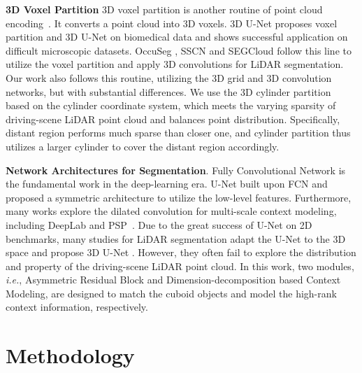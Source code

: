 \documentclass{article}
\def\ie{\emph{i.e.}}
\begin{document}
  \textbf{3D Voxel Partition}
  3D voxel partition is another routine of point cloud encoding~\cite{wang2020reconfigurable,han2020occuseg,zhu2020ssn,tchapmi2017segcloud,graham20183d}. It converts a point cloud into 3D voxels. 3D U-Net \citep{cciccek20163d} proposes voxel partition and 3D U-Net on biomedical data and shows successful application on difficult microscopic datasets. OccuSeg \citep{han2020occuseg}, SSCN \citep{graham20183d} and SEGCloud \citep{tchapmi2017segcloud} follow this line to utilize the voxel partition and apply 3D convolutions for LiDAR segmentation. Our work also follows this routine, utilizing the 3D grid and 3D convolution networks, but with substantial differences. We use the 3D cylinder partition based on the cylinder coordinate system, which meets the varying sparsity of driving-scene LiDAR point cloud and balances point distribution. Specifically, distant region performs much sparse than closer one, and cylinder partition thus utilizes a larger cylinder to cover the distant region accordingly. 
   




\textbf{Network Architectures for Segmentation}. Fully Convolutional Network \citep{long2015fully} is the fundamental work in the deep-learning era. U-Net \citep{ronneberger2015u} built upon FCN and proposed a symmetric architecture to utilize the low-level features. Furthermore, many works explore the dilated convolution for multi-scale context modeling, including DeepLab\citep{chen2017deeplab, chen2018encoder} and PSP~\cite{zhao2017pyramid}.
Due to the great success of U-Net on 2D benchmarks, many studies for LiDAR segmentation adapt the U-Net to the 3D space and propose 3D U-Net \citep{cciccek20163d}. However, they often fail to explore the distribution and property of the driving-scene LiDAR point cloud. In this work, two modules, \ie, Asymmetric Residual Block and Dimension-decomposition based Context Modeling, are designed to match the cuboid objects and model the high-rank context information, respectively.

%
 

	


\section{Methodology}
\label{sec:methods}
\end{document}
